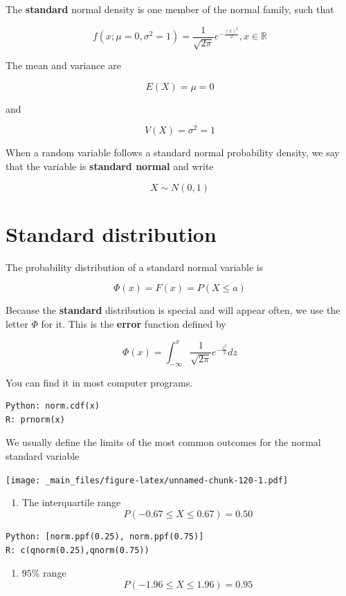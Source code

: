 \documentclass[
]{book}
\providecommand{\tightlist}{%
  \setlength{\itemsep}{0pt}\setlength{\parskip}{0pt}}
\begin{document}
The \textbf{standard} normal density is one member of the normal family, such that

\[f(x; \mu=0, \sigma^2=1)=\frac{1}{\sqrt{2\pi}}e^{-\frac{(x)^2}{2}}, x \in {\mathbb R}\]

The mean and variance are

\[E (X)= \mu = 0\]

and

\[V (X)=  \sigma^2 =1\]

When a random variable follows a standard normal probability density, we say that the variable is \textbf{standard normal} and write

\[X \sim N(0,1)\]

\hypertarget{standard-distribution}{%
\section{Standard distribution}\label{standard-distribution}}

The probability distribution of a standard normal variable is

\[\Phi(x)=F(x)=P(X \leq a)\]

Because the \textbf{standard} distribution is special and will appear often, we use the letter \(\Phi\) for it. This is the \textbf{error} function defined by

\[\Phi(x)=\int_{-\infty}^{x} \frac{1}{\sqrt{2\pi}}e^{-\frac{z^2}{2}} dz\]

You can find it in most computer programs.

\begin{verbatim}
Python: norm.cdf(x)
R: prnorm(x)
\end{verbatim}

We usually define the limits of the most common outcomes for the normal standard variable

\texttt{[image: \_main\_files/figure-latex/unnamed-chunk-120-1.pdf]}

\begin{enumerate}
\def\labelenumi{\arabic{enumi})}
\tightlist
\item
  The interquartile range \[P(-0.67 \leq X \leq 0.67)=0.50\]
\end{enumerate}

\begin{verbatim}
Python: [norm.ppf(0.25), norm.ppf(0.75)]
R: c(qnorm(0.25),qnorm(0.75))
\end{verbatim}

\begin{enumerate}
\def\labelenumi{\arabic{enumi})}
\setcounter{enumi}{1}
\tightlist
\item
  \(95\%\) range \[P(-1.96 \leq X \leq 1.96)=0.95\]
\end{enumerate}
\end{document}
